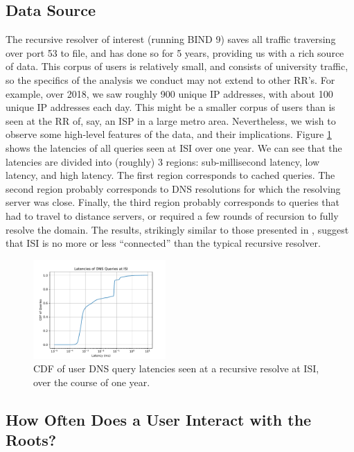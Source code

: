 \documentclass[sigconf,nonacm,10pt]{acmart}
\begin{document}
\subsection{Data Source}\label{data-source}

\label{sec:rr_close_look_data} The recursive resolver of interest
(running BIND 9) saves all traffic traversing over port 53 to file, and
has done so for 5 years, providing us with a rich source of data. This
corpus of users is relatively small, and consists of university traffic,
so the specifics of the analysis we conduct may not extend to other
RR's. For example, over 2018, we saw roughly 900 unique IP addresses,
with about 100 unique IP addresses each day. This might be a smaller
corpus of users than is seen at the RR of, say, an ISP in a large metro
area. Nevertheless, we wish to observe some high-level features of the
data, and their implications. \break
Figure \ref{fig:all_dns_latencies_isi} shows the latencies of all
queries seen at ISI over one year. We can see that the latencies are
divided into (roughly) 3 regions: sub-millisecond latency, low latency,
and high latency. The first region corresponds to cached queries. The
second region probably corresponds to DNS resolutions for which the
resolving server was close. Finally, the third region probably
corresponds to queries that had to travel to distance servers, or
required a few rounds of recursion to fully resolve the domain. The
results, strikingly similar to those presented in
\cite{callahan2013modern}, suggest that ISI is no more or less
``connected'' than the typical recursive resolver.

\begin{figure}
    \centering
    \includegraphics[width=0.45\textwidth]{figures/all_dns_latencies_isi.pdf}
    \caption{CDF of user DNS query latencies seen at a recursive resolve at ISI, over the course of one year. }
    \label{fig:all_dns_latencies_isi}
\end{figure}

\subsection{How Often Does a User Interact with the
Roots?}\label{how-often-does-a-user-interact-with-the-roots}
\end{document}
